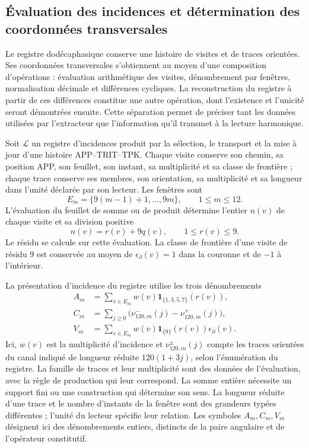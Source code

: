 \subsection{Évaluation des incidences et détermination des coordonnées transversales}
\label{iii:r25:incidencias}

Le registre dodécaphasique conserve une histoire de visites et de traces
orientées. Ses coordonnées transversales s’obtiennent au moyen d’une
composition d’opérations : évaluation arithmétique des visites,
dénombrement par fenêtres, normalisation décimale et différences cycliques.
La reconstruction du registre à partir de ces différences constitue
une autre opération, dont l’existence et l’unicité seront démontrées ensuite.
Cette séparation permet de préciser tant les données utilisées par
l’extracteur que l’information qu’il transmet à la lecture harmonique.

Soit $\mathscr L$ un registre d’incidences produit par la sélection,
le transport et la mise à jour d’une histoire APP--TRIT--TPK.
Chaque visite conserve son chemin, sa position APP, son feuillet, son instant,
sa multiplicité et sa classe de frontière ; chaque trace conserve ses membres,
son orientation, sa multiplicité et sa longueur dans l’unité déclarée par son
lecteur. Les fenêtres sont
\[
 E_m=\{9(m-1)+1,\ldots,9m\},\qquad 1\leq m\leq12.
\]
L’évaluation du feuillet de somme ou de produit détermine l’entier
$n(v)$ de chaque visite et sa division positive
\[
 n(v)=r(v)+9q(v),\qquad 1\leq r(v)\leq9.
\]
Le résidu se calcule sur cette évaluation. La classe de frontière d’une
visite de résidu $9$ est conservée au moyen de
$\epsilon_\partial(v)=1$ dans la couronne et de $-1$ à l’intérieur.

La présentation d’incidence du registre utilise les trois dénombrements
\begin{align}
 A_m&=\sum_{v\in E_m}w(v)
       \mathbf1_{\{1,3,5,7\}}(r(v)),\label{iii:r25:recuento-a}\\
 C_m&=\sum_{j\geq0}
       \bigl(\nu^-_{120,m}(j)-\nu^+_{120,m}(j)\bigr),
       \label{iii:r25:recuento-c}\\
 V_m&=\sum_{v\in E_m}w(v)
       \mathbf1_{\{9\}}(r(v))\epsilon_\partial(v).
       \label{iii:r25:recuento-v}
\end{align}
Ici, $w(v)$ est la multiplicité d’incidence et
$\nu^\pm_{120,m}(j)$ compte les traces orientées du canal indiqué
de longueur réduite $120(1+3j)$, selon l’énumération du registre.
La famille de traces et leur multiplicité sont des données de l’évaluation,
avec la règle de production qui leur correspond. La somme entière nécessite
un support fini ou une construction qui détermine son sens.
La longueur réduite d’une trace et le nombre d’instants de la
fenêtre sont des grandeurs typées différentes ; l’unité du lecteur
spécifie leur relation. Les symboles $A_m,C_m,V_m$ désignent ici
des dénombrements entiers, distincts de la paire angulaire et de l’opérateur constitutif.

